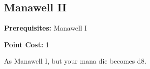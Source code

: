 \subsection{Manawell II}\label{feat:manawell2}

\noindent
\textbf{Prerequisites:} Manawell I

\noindent
\textbf{Point Cost:} 1 

As Manawell I, but your mana die becomes d8.
